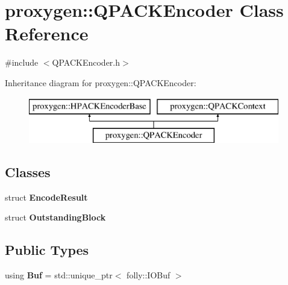 \section{proxygen\+:\+:Q\+P\+A\+C\+K\+Encoder Class Reference}
\label{classproxygen_1_1QPACKEncoder}


{\ttfamily \#include $<$Q\+P\+A\+C\+K\+Encoder.\+h$>$}

Inheritance diagram for proxygen\+:\+:Q\+P\+A\+C\+K\+Encoder\+:\begin{figure}[H]
\begin{center}
\leavevmode
\includegraphics[height=2.000000cm]{classproxygen_1_1QPACKEncoder}
\end{center}
\end{figure}
\subsection*{Classes}
\begin{DoxyCompactItemize}
\item 
struct {\bf Encode\+Result}
\item 
struct {\bf Outstanding\+Block}
\end{DoxyCompactItemize}
\subsection*{Public Types}
\begin{DoxyCompactItemize}
\item 
using {\bf Buf} = std\+::unique\+\_\+ptr$<$ folly\+::\+I\+O\+Buf $>$
\end{DoxyCompactItemize}
